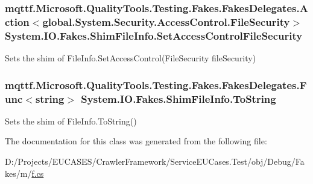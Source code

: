 \hypertarget{class_system_1_1_i_o_1_1_fakes_1_1_shim_file_info_af18b0e2cbc3a948d003da3a05f6a282f}{
\subsubsection[{Set\-Access\-Control\-File\-Security}]{\setlength{\rightskip}{0pt plus 5cm}mqttf.\-Microsoft.\-Quality\-Tools.\-Testing.\-Fakes.\-Fakes\-Delegates.\-Action$<$global.\-System.\-Security.\-Access\-Control.\-File\-Security$>$ System.\-I\-O.\-Fakes.\-Shim\-File\-Info.\-Set\-Access\-Control\-File\-Security\hspace{0.3cm}{\ttfamily [set]}}}\label{class_system_1_1_i_o_1_1_fakes_1_1_shim_file_info_af18b0e2cbc3a948d003da3a05f6a282f}


Sets the shim of File\-Info.\-Set\-Access\-Control(\-File\-Security file\-Security)

\hypertarget{class_system_1_1_i_o_1_1_fakes_1_1_shim_file_info_a89c3875fe47c8c626a43b6f6d878ad20}{
\subsubsection[{To\-String}]{\setlength{\rightskip}{0pt plus 5cm}mqttf.\-Microsoft.\-Quality\-Tools.\-Testing.\-Fakes.\-Fakes\-Delegates.\-Func$<$string$>$ System.\-I\-O.\-Fakes.\-Shim\-File\-Info.\-To\-String\hspace{0.3cm}{\ttfamily [set]}}}\label{class_system_1_1_i_o_1_1_fakes_1_1_shim_file_info_a89c3875fe47c8c626a43b6f6d878ad20}


Sets the shim of File\-Info.\-To\-String()



The documentation for this class was generated from the following file\-:\begin{DoxyCompactItemize}
\item 
D\-:/\-Projects/\-E\-U\-C\-A\-S\-E\-S/\-Crawler\-Framework/\-Service\-E\-U\-Cases.\-Test/obj/\-Debug/\-Fakes/m/\hyperlink{m_2f_8cs}{f.\-cs}\end{DoxyCompactItemize}

